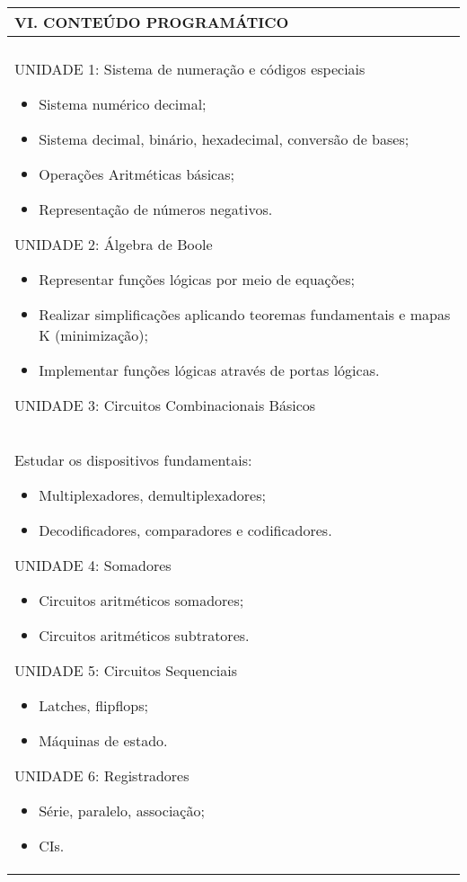 \documentclass[12pt]{article}
\begin{document}
\begin{longtable}{|L{1.025\textwidth}|} \hline
%
{\bf VI. CONTEÚDO PROGRAMÁTICO } \\ \hline\\
UNIDADE 1: Sistema de numeração e códigos especiais 
\begin{itemize}
    \item Sistema numérico decimal;
    \item Sistema decimal, binário, hexadecimal, conversão de bases;
    \item Operações Aritméticas básicas;
    \item Representação de números negativos.
\end{itemize}

UNIDADE 2: Álgebra de Boole 
\begin{itemize}
    \item Representar funções lógicas por meio de equações;
    \item Realizar simplificações aplicando teoremas fundamentais e mapas K (minimização);
    \item Implementar funções lógicas através de portas lógicas.
\end{itemize}

UNIDADE 3: Circuitos Combinacionais Básicos\\
Estudar os dispositivos fundamentais:
\begin{itemize}
    \item  Multiplexadores, demultiplexadores;
    \item Decodificadores, comparadores e codificadores.
\end{itemize}

UNIDADE 4: Somadores 
\begin{itemize}
    \item Circuitos aritméticos somadores;
    \item Circuitos aritméticos subtratores.
\end{itemize}

UNIDADE 5: Circuitos Sequenciais
\begin{itemize}
    \item Latches, flipflops;
    \item Máquinas de estado.
\end{itemize}

UNIDADE 6: Registradores 
\begin{itemize}
    \item Série, paralelo, associação;
    \item CIs.
\end{itemize}


\end{longtable}
\end{document}
